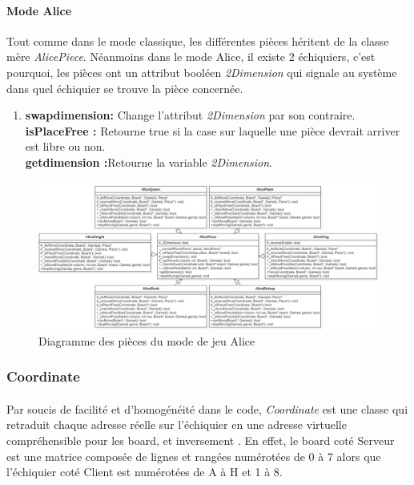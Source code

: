 \documentclass[10pt, a4paper]{article}
\begin{document}
\paragraph{Mode Alice}
Tout comme dans le mode classique, les différentes pièces héritent de la classe mère \textit{AlicePiece}. Néanmoins dans le mode Alice, il existe 2 échiquiers, c'est pourquoi, les pièces ont un attribut booléen \textit{2Dimension} qui signale au système dans quel échiquier se trouve la pièce concernée.
\begin{enumerate}
\item
\textbf{swapdimension:} Change l'attribut \textit{2Dimension} par son contraire. \\
\textbf{isPlaceFree :} Retourne true si la case sur laquelle une pièce devrait arriver est libre ou non.\\
\textbf{getdimension :}Retourne la variable \textit{2Dimension}.
\end{enumerate}

\begin{figure}[H]
\centering
\includegraphics[scale=0.5]{alice_pieces.png}
\caption{Diagramme des pièces du mode de jeu Alice}
\end{figure}



\subsubsection{Coordinate}
\paragraph{}Par soucis de facilité et d'homogénéité dans le code, \textit{Coordinate} est une classe qui retraduit chaque adresse réelle sur l'échiquier en une adresse virtuelle compréhensible pour les board, et inversement . En effet, le board coté Serveur est une matrice composée de lignes et rangées numérotées de 0 à 7 alors que l'échiquier coté Client est numérotées de A à H et 1 à 8.
\end{document}
